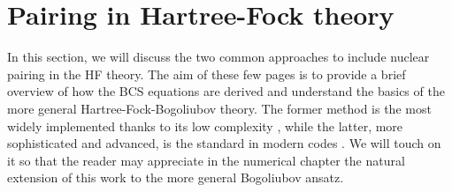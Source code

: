 \section{Pairing in Hartree-Fock theory}
\label{sec:pairing_hf}
In this section, we will discuss the two common approaches to include nuclear pairing in the HF theory. The aim of these few pages is to provide a brief overview of how the BCS equations are derived and understand the basics of the more general Hartree-Fock-Bogoliubov theory. The former method is the most widely implemented thanks to its low complexity \cite{hfbcsqrpa,oldEv8,skyax}, while the latter, more sophisticated and advanced, is the standard in modern codes \cite{hfodd, hfbftt,MAREVIC2022108367}. We will touch on it so that the reader may appreciate in the numerical chapter the natural extension of this work to the more general Bogoliubov ansatz. 
